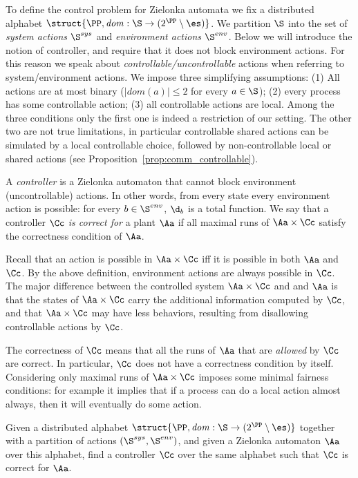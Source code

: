 \documentclass[10pt,a4paper]{article}
\newcommand{\loc}{\mathit{dom}}
\newcommand{\Ssys}{\S^{sys}}
\newcommand{\Senv}{\S^{env}}
\begin{document}
To define the control problem for Zielonka automata we fix a
distributed alphabet $\struct{\PP,\loc:\S\to (2^\PP \setminus
  \es)}$. We partition $\S$ into the set of \emph{system actions} $\Ssys$ and
\emph{environment actions} $\Senv$. Below we will introduce the notion of
controller, and require that it does not block environment
actions. For this reason we speak about
\emph{controllable/uncontrollable} actions when referring to system/environment
actions. We impose three simplifying assumptions: (1) All actions are
at most binary ($|\loc(a)|\le 2$ for every $a \in\S$); (2) every
process has some controllable action; (3) 
all controllable actions are local. 
Among the three conditions only the first one is indeed a restriction of
our setting. The other two are not true limitations, in particular controllable
shared actions can be simulated by a local controllable choice, followed by 
non-controllable local or shared actions (see
Proposition~\ref{prop:comm_controllable}).

\begin{definition}
  A \emph{controller} is a Zielonka automaton that cannot block
  environment (uncontrollable) actions. In other words, from every
state every environment action is possible: for every
  $b\in\Senv$, $\d_b$ is a total function.  We say that a controller
  $\Cc$ \emph{is correct for} a plant $\Aa$ if all maximal runs of $\Aa\times
  \Cc$ satisfy the correctness condition of $\Aa$.
\end{definition}

Recall that an action is possible in  $\Aa\times
  \Cc$ iff it is possible in both $\Aa$ and $\Cc$. By the above
  definition, environment actions
  are always possible in $\Cc$. The major difference between the
  controlled system $\Aa \times \Cc$ and
and $\Aa$ is that the states of $\Aa \times \Cc$ carry  the
additional information computed by $\Cc$, and that $\Aa \times
  \Cc$ may have less behaviors, resulting from disallowing controllable actions
  by $\Cc$.

The correctness of $\Cc$ means that all the runs of $\Aa$ that are
\emph{allowed} by $\Cc$ are correct. In particular, $\Cc$ does not have
a correctness condition by itself. Considering only maximal runs of
$\Aa \times \Cc$ imposes some minimal fairness conditions: for example
it implies that if a process can do a local action almost
always, then it will eventually do some action. 

\begin{definition}
  Given a distributed alphabet $\struct{\PP,\loc:\S\to (2^\PP \setminus
    \es)}$ together with a partition of actions $(\Ssys,\Senv)$, and
  given a Zielonka automaton $\Aa$ over this alphabet, find a controller $\Cc$ over the same alphabet such that $\Cc$ is
  correct for $\Aa$.
\end{definition}
\end{document}
